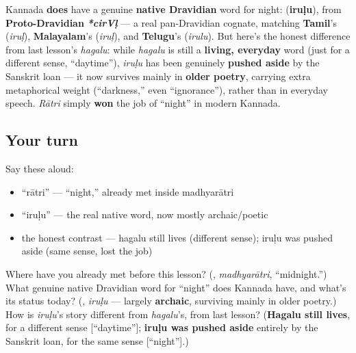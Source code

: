\begin{cousinweb}
Kannada \textbf{does} have a genuine \textbf{native Dravidian} word for night: \textbf{} (\textbf{iruḷu}), from \textbf{Proto-Dravidian} \emph{\textbf{*cirVḷ}} — a real pan-Dravidian cognate, matching \textbf{Tamil}'s \textbf{} (\emph{iruḷ}), \textbf{Malayalam}'s \textbf{} (\emph{iruḷ}), and \textbf{Telugu}'s \textbf{} (\emph{irulu}). But here's the honest difference from last lesson's \emph{hagalu}: while \emph{hagalu} is still a \textbf{living, everyday} word (just for a different sense, \textquotedblleft{}daytime\textquotedblright{}), \emph{iruḷu} has been genuinely \textbf{pushed aside} by the Sanskrit loan — it now survives mainly in \textbf{older poetry}, carrying extra metaphorical weight (\textquotedblleft{}darkness,\textquotedblright{} even \textquotedblleft{}ignorance\textquotedblright{}), rather than in everyday speech. \emph{Rātri} simply \textbf{won} the job of \textquotedblleft{}night\textquotedblright{} in modern Kannada.
\end{cousinweb}

\subsection*{Your turn}
Say these aloud:

\begin{itemize}
\raggedright
  \item \textquotedblleft{}rātri\textquotedblright{} — \textquotedblleft{}night,\textquotedblright{} already met inside madhyarātri
  \item \textquotedblleft{}iruḷu\textquotedblright{} — the real native word, now mostly archaic/poetic
  \item the honest contrast — hagalu still lives (different sense); iruḷu was pushed aside (same sense, lost the job)
\end{itemize}

\begin{tcolorbox}[breakable,colback=teal!4,colframe=teal!35!black,title={Before you move on}]
Where have you already met \textbf{} before this lesson? (\textbf{}, \emph{madhyarātri}, \textquotedblleft{}midnight.\textquotedblright{}) What genuine native Dravidian word for \textquotedblleft{}night\textquotedblright{} does Kannada have, and what's its status today? (\textbf{}, \emph{iruḷu} — largely \textbf{archaic}, surviving mainly in older poetry.) How is \emph{iruḷu}'s story different from \emph{hagalu}'s, from last lesson? (\textbf{Hagalu still lives}, for a different sense {[}\textquotedblleft{}daytime\textquotedblright{}{]}; \textbf{iruḷu was pushed aside} entirely by the Sanskrit loan, for the same sense {[}\textquotedblleft{}night\textquotedblright{}{]}.)
\end{tcolorbox}
